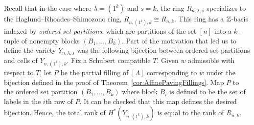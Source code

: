 \documentclass[12pt]{amsart}
\newcommand{\la}{\lambda}
\begin{document}
\begin{remark}
  Recall that in the case where $\la=(1^k)$ and $s=k$, the ring $R_{n,\la,s}$ specializes to the Haglund--Rhoades--Shimozono ring, $R_{n,(1^k),k} \cong R_{n,k}$. This ring has a $\mathbb{Z}$-basis indexed by \emph{ordered set partitions}, which are partitions of the set $[n]$ into a $k$-tuple of nonempty blocks $(B_1,\dots, B_k)$. Part of the motivation that led us to define the variety $Y_{n,\la,s}$ was the following bijection between ordered set partitions and cells of $Y_{n,(1^k),k}$. Fix a Schubert compatible $T$. Given $w$ admissible with respect to $T$, let $P$ be the partial filling of $[\Lambda]$ corresponding to $w$ under the bijection defined in the proof of Theorem~\ref{cor:AffinePavingFillings}. Map $P$ to the ordered set partition $(B_1,\dots, B_k)$ where block $B_i$ is defined to be the set of labels in the $i$th row of $P$. It can be checked that this map defines the desired bijection. Hence, the total rank of $H^*(Y_{n,(1^k),k})$ is equal to the rank of $R_{n,k}$.


\end{remark}
\end{document}
